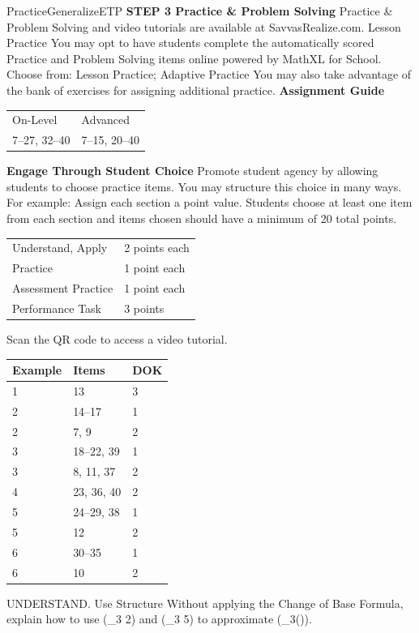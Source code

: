 \documentclass{article}
\newenvironment{item-analysis}{}{}      %
\newenvironment{practice}[2]{}{}        %
\newenvironment{te-addendum}[2]{}{}     %
\newcommand{\answer}[1]{}               %
\begin{document}
\begin{te-addendum}{Practice}{GeneralizeETP}
\textbf{STEP 3 Practice \& Problem Solving}
Practice \& Problem Solving and video tutorials are available at SavvasRealize.com.
Lesson Practice You may opt to have students complete the automatically scored Practice and Problem Solving items online powered by MathXL for School.
Choose from: Lesson Practice; Adaptive Practice
You may also take advantage of the bank of exercises for assigning additional practice.
\textbf{Assignment Guide}
\begin{tabular}{ll}
On-Level & Advanced \\
7--27, 32--40 & 7--15, 20--40 \\
\end{tabular}
\textbf{Engage Through Student Choice}
Promote student agency by allowing students to choose practice items. You may structure this choice in many ways.
For example:
Assign each section a point value. Students choose at least one item from each section and items chosen should have a minimum of 20 total points.
\begin{tabular}{ll}
Understand, Apply & 2 points each \\
Practice & 1 point each \\
Assessment Practice & 1 point each \\
Performance Task & 3 points \\
\end{tabular}
Scan the QR code to access a video tutorial.
\end{te-addendum}
\begin{item-analysis}
\begin{tabular}{lll}
\toprule
Example & Items & DOK \\
\midrule
1 & 13 & 3 \\
2 & 14--17 & 1 \\
2 & 7, 9 & 2 \\
3 & 18--22, 39 & 1 \\
3 & 8, 11, 37 & 2 \\
4 & 23, 36, 40 & 2 \\
5 & 24--29, 38 & 1 \\
5 & 12 & 2 \\
6 & 30--35 & 1 \\
6 & 10 & 2 \\
\bottomrule
\end{tabular}
\end{item-analysis}
\begin{practice}{7}{2}
UNDERSTAND. Use Structure Without applying the Change of Base Formula, explain how to use (\log_3 2) and (\log_3 5) to approximate (\log_3()).
\answer{Use the Quotient Property to rewrite (\log_3(\frac{2}{5})) as (\log_3 2-\log_3 5). Substitute 0.631 for (\log_3 2) and 1.465 for (\log_3 5), then subtract to approximate the logarithm as (-0.834).}
\end{practice}
\end{document}
